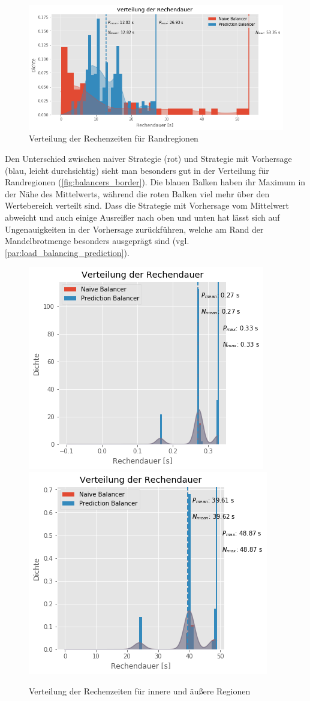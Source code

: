 \begin{figure}
	\centering
	\includegraphics[width=0.9\linewidth]{img/Evaluation/balancers/balancers_border.png}
	\caption{Verteilung der Rechenzeiten für Randregionen}
	\label{fig:balancers_border}
\end{figure}

Den Unterschied zwischen naiver Strategie (rot) und Strategie mit Vorhersage (blau, leicht durchsichtig) sieht man besonders gut in der Verteilung für Randregionen (\autoref{fig:balancers_border}).
Die blauen Balken haben ihr Maximum in der Nähe des Mittelwerts, während die roten Balken viel mehr über den Wertebereich verteilt sind.
Dass die Strategie mit Vorhersage vom Mittelwert abweicht und auch einige Ausreißer nach oben und unten hat lässt sich auf Ungenauigkeiten in der Vorhersage zurückführen, welche am Rand der Mandelbrotmenge besonders ausgeprägt sind (vgl. \autoref{par:load_balancing_prediction}).

\begin{figure}
	\centering
	\includegraphics[width=0.45\linewidth]{img/Evaluation/balancers/balancers_outside_slim.png}
	\includegraphics[width=0.45\linewidth]{img/Evaluation/balancers/balancers_inside_slim.png}
	\caption{Verteilung der Rechenzeiten für innere und äußere Regionen}
	\label{fig:balancers_inside_outside}
\end{figure}

